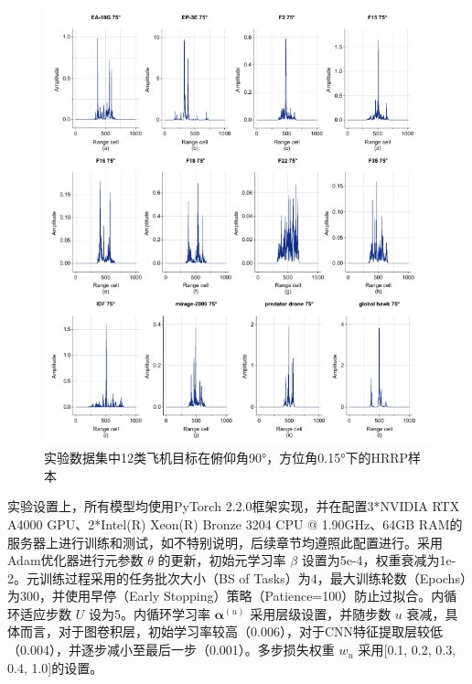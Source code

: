 \begin{figure}[h!]
    \centering
    \includegraphics[width=\linewidth]{figures/hrrp_samples.pdf} %
    \caption{实验数据集中12类飞机目标在俯仰角90°，方位角0.15°下的HRRP样本}
    \label{fig:dataset_chap3}
\end{figure}

实验设置上，所有模型均使用PyTorch 2.2.0框架实现，并在配置3*NVIDIA RTX A4000 GPU、2*Intel(R) Xeon(R) Bronze 3204 CPU @ 1.90GHz、64GB RAM的服务器上进行训练和测试，如不特别说明，后续章节均遵照此配置进行。采用Adam优化器进行元参数 $\theta$ 的更新，初始元学习率 $\beta$ 设置为5e-4，权重衰减为1e-2。元训练过程采用的任务批次大小（BS of Tasks）为4，最大训练轮数（Epochs）为300，并使用早停（Early Stopping）策略（Patience=100）防止过拟合。内循环适应步数 $U$ 设为5。内循环学习率 $\boldsymbol{\alpha}^{(u)}$ 采用层级设置，并随步数 $u$ 衰减，具体而言，对于图卷积层，初始学习率较高（0.006），对于CNN特征提取层较低（0.004），并逐步减小至最后一步（0.001）。多步损失权重 $w_u$ 采用[0.1, 0.2, 0.3, 0.4, 1.0]的设置。


